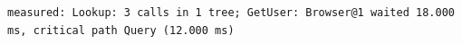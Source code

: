 \begin{lstlisting}[language={},basicstyle=\ttfamily\scriptsize,breaklines=true]
measured: Lookup: 3 calls in 1 tree; GetUser: Browser@1 waited 18.000 ms, critical path Query (12.000 ms)
\end{lstlisting}
